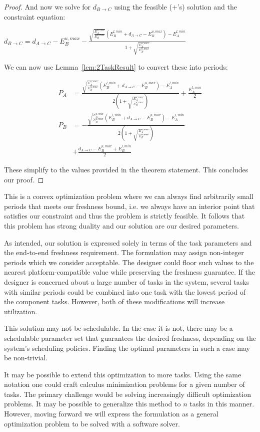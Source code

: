 \begin{proof}
	And now we solve for $d_{B \to C}$ using the feasible ($+$'s) solution and the constraint equation:
	
	\begin{center}
		$d_{B \to C} = d_{A \to C} - E^{u,max}_B- \frac{\sqrt{\frac{E^{u,max}_A}{E^{u,max}_B}}(E^{l,min}_B+d_{A \to C}-E^{u,max}_B)-E^{l,min}_A}{1+\sqrt{\frac{E^{u,max}_A}{E^{u,max}_B}}}$
	\end{center}
	
	We can now use Lemma~\ref{lem:2TaskResult} to convert these into periods:
	
	\begin{align*}
		P_A &= \frac{\sqrt{\frac{E^{u,max}_A}{E^{u,max}_B}}(E^{l,min}_B+d_{A \to C}-E^{u,max}_B)-E^{l,min}_A}{2(1+\sqrt{\frac{E^{u,max}_A}{E^{u,max}_B}})}+ \frac{E^{l,min}_A}{2}\\
		P_B &= -\frac{\sqrt{\frac{E^{u,max}_A}{E^{u,max}_B}}(E^{l,min}_B+d_{A \to C}-E^{u,max}_B)-E^{l,min}_A}{2(1+\sqrt{\frac{E^{u,max}_A}{E^{u,max}_B}})} \\&+\frac{d_{A \to C}-E^{u,max}_B+E^{l,min}_B}{2}
	\end{align*}
	
	These simplify to the values provided in the theorem statement. This concludes our proof.
\end{proof}

This is a convex optimization problem where we can always find arbitrarily small periods that meets our freshness bound, i.e. we always have an interior point that satisfies our constraint and thus the problem is strictly feasible. It follows that this problem has strong duality and our solution are our desired parameters.

As intended, our solution is expressed solely in terms of the task parameters and the end-to-end freshness requirement. The formulation may assign non-integer periods which we consider acceptable. The designer could floor such values to the nearest platform-compatible value while preserving the freshness guarantee. If the designer is concerned about a large number of tasks in the system, several tasks with similar periods could be combined into one task with the lowest period of the component tasks. However, both of these modifications will increase utilization.

This solution may not be schedulable. In the case it is not, there may be a schedulable parameter set that guarantees the desired freshness, depending on the system's scheduling policies. Finding the optimal parameters in such a case may be non-trivial.

It may be possible to extend this optimization to more tasks. Using the same notation one could craft calculus minimization problems for a given number of tasks. The primary challenge would be solving increasingly difficult optimization problems. It may be possible to generalize this method to $n$ tasks in this manner. However, moving forward we will express the formulation as a general optimization problem to be solved with a software solver.